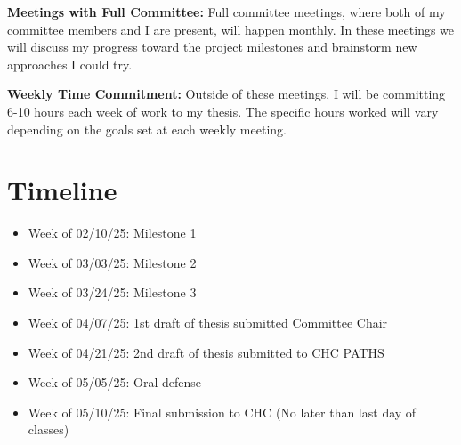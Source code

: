 \documentclass[11pt]{article}
\begin{document}
\textbf{Meetings with Full Committee:} Full committee meetings, where both of my committee members and I are present, will happen monthly.
In these meetings we will discuss my progress toward the project milestones and brainstorm new approaches I could try.

\textbf{Weekly Time Commitment:} Outside of these meetings, I will be committing 6-10 hours each week of work to my thesis.
The specific hours worked will vary depending on the goals set at each weekly meeting.

\section{Timeline}

\begin{itemize}
    \item Week of 02/10/25: Milestone 1
    \item Week of 03/03/25: Milestone 2
    \item Week of 03/24/25: Milestone 3
    \item Week of 04/07/25: 1st draft of thesis submitted Committee Chair
    \item Week of 04/21/25: 2nd draft of thesis submitted to CHC PATHS
    \item Week of 05/05/25: Oral defense
    \item Week of 05/10/25: Final submission to CHC (No later than last day of classes)
\end{itemize}

\newpage



\end{document}
